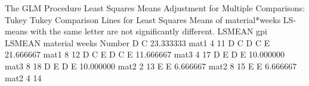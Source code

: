 \documentclass{article}
\begin{document}
\begin{Woutput}
The GLM Procedure
Least Squares Means
Adjustment for Multiple Comparisons: Tukey
Tukey Comparison Lines for Least Squares Means of material*weeks
LS-means with the same letter are not significantly different.
                                                  LSMEAN
               gpi LSMEAN    material    weeks    Number
D    C          23.333333    mat1        4            11
D    C
D    C    E     21.666667    mat1        8            12
D    C    E
D    C    E     11.666667    mat3        4            17
D         E
D         E     10.000000    mat3        8            18
D         E
D         E     10.000000    mat2        2            13
          E
          E      6.666667    mat2        8            15
          E
          E      6.666667    mat2        4            14
\end{Woutput}
\end{document}
